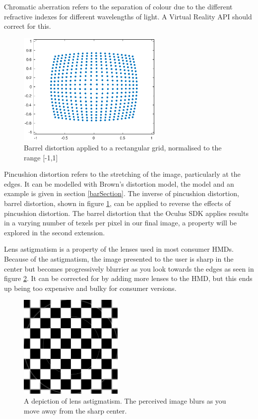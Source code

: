 \documentclass[12pt,a4paper,twoside,openright]{report}
\begin{document}
Chromatic aberration refers to the separation of colour due to the different refractive indexes for different wavelengths of light. A Virtual Reality API should correct for this.

\begin{figure}
\centerline{\includegraphics[width=7cm]{figs/post_distortion.eps}}
\caption{Barrel distortion applied to a rectangular grid, normalised to the range [-1,1]}
\label{barreldist}
\end{figure}

Pincushion distortion refers to the stretching of the image, particularly at the edges. It can be modelled with Brown's distortion model, the model and an example is given in section \ref{barSection}.  The inverse of pincushion distortion, barrel distortion, shown in figure \ref{barreldist}, can be applied to reverse the effects of pincushion distortion. The barrel distortion that the Oculus SDK\cite{oculus} applies results in a varying number of texels per pixel in our final image, a property will be explored in the second extension.

Lens astigmatism is a property of the lenses used in most consumer HMDs. Because of the astigmatism, the image presented to the user is sharp in the center but becomes progressively blurrier as you look towards the edges as seen in figure \ref{blurred}. It can be corrected for by adding more lenses to the HMD, but this ends up being too expensive and bulky for consumer versions.

\begin{figure}
\centerline{\includegraphics[width=5cm]{figs/blur.png}}
\caption{A depiction of lens astigmatism. The perceived image blurs as you move away from the sharp center.}
\label{blurred}
\end{figure}
\end{document}
